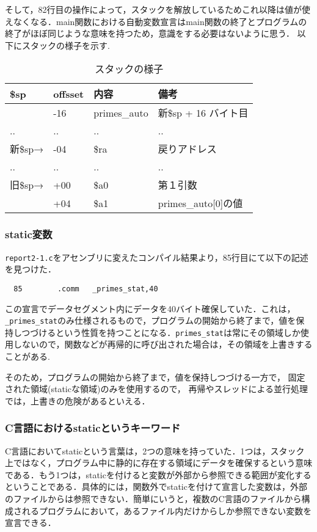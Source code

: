 \documentclass[a4j,11pt]{jarticle}
\begin{document}
そして，82行目の操作によって，スタックを解放しているためこれ以降は値が使えなくなる．main関数における自動変数宣言はmain関数の終了とプログラムの終了がほぼ同じような意味を持つため，意識をする必要はないように思う．
以下にスタックの様子を示す.
\begin{table}[htb]
  \label{tab:stack2}
  \centering
  \begin{tabular}{|l|l|l|l|}
  \hline
  \$sp   & offsset & 内容           & 備考                    \\ \hline
         & -16     & primes\_auto & 新\$sp + 16 バイト目       \\ \hline
  ..     & ..      & ..           & ..                    \\ \hline
  新\$sp→ & -04     & \$ra         & 戻りアドレス                \\ \hline
  ..     & ..      & ..           & ..                    \\ \hline
  旧\$sp→ & +00     & \$a0         & 第１引数                  \\ \hline
         & +04     & \$a1         & primes\_auto{[}0{]}の値 \\ \hline
  \end{tabular}
  \caption{スタックの様子}
  \end{table}

\subsubsection{static変数}
\verb|report2-1.c|をアセンブリに変えたコンパイル結果より，85行目にて以下の記述を見つけた．
\begin{verbatim}
  85		.comm	_primes_stat,40
\end{verbatim}
この宣言でデータセグメント内にデータを40バイト確保していた．これは，\verb|_primes_stat|のみ仕様されるもので，プログラムの開始から終了まで，値を保持しつづけるという性質を持つことになる．\verb|primes_stat|は常にその領域しか使用しないので，関数などが再帰的に呼び出された場合は，その領域を上書きすることがある.

そのため，プログラムの開始から終了まで，値を保持しつづける一方で， 固定された領域(staticな領域)のみを使用するので， 再帰やスレッドによる並行処理では，上書きの危険があるといえる．

\subsubsection{C言語におけるstaticというキーワード}
C言語においてstaticという言葉は，2つの意味を持っていた．1つは，スタック上ではなく，プログラム中に静的に存在する領域にデータを確保するという意味である．もう1つは，staticを付けると変数が外部から参照できる範囲が変化するということである．具体的には，関数外でstaticを付けて宣言した変数は，外部のファイルからは参照できない．簡単にいうと，複数のC言語のファイルから構成されるプログラムにおいて，あるファイル内だけからしか参照できない変数を宣言できる．
\end{document}
